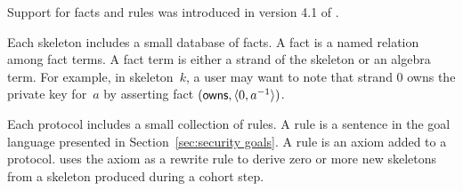 \documentclass[12pt]{report}
\theoremstyle{definition}
\begin{document}
Support for facts and rules was introduced in version 4.1 of {\cpsa}.

Each skeleton includes a small database of facts.  A fact is a named
relation among fact terms.  A fact term is either a
strand of the skeleton or an algebra term.  For example, in
skeleton~$k$, a user may want to note that strand 0 owns the private
key for~$a$ by asserting fact $(\operatorname{\mathsf{owns}},\langle0, a^{-1}\rangle)$.

Each protocol includes a small collection of rules.  A rule is a
sentence in the goal language presented in Section~\ref{sec:security
  goals}.  A rule is an axiom added to a protocol.  {\cpsa} uses the
axiom as a rewrite rule to derive zero or more new skeletons from a
skeleton produced during a cohort step.




\printindex
\end{document}
